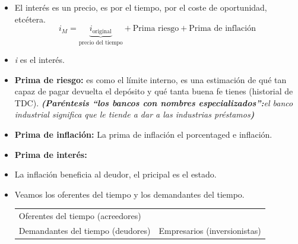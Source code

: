 \begin{itemize}
    \item El interés es un precio, es por el tiempo, por el coste de oportunidad, etcétera.
    \[
      i_{M}= \underbrace{i_{\text{original}}}_{\text{precio del tiempo}} + \text{Prima riesgo} + \text{Prima de inflación}
    \]
    
    \item \emph{i} es el interés.
    \item \textbf{Prima de riesgo:} es como el límite interno, es una estimación de qué tan capaz de pagar devuelta el depósito y qué tanta buena fe tienes (historial de TDC). \emph{\textbf{(Paréntesis ``los bancos con nombres especializados'':}el banco industrial significa que le tiende a dar a las industrias préstamos\textbf{)}}
    \item \textbf{Prima de inflación:} La prima de inflación el porcentaged e inflación.
    \item \textbf{Prima de interés:} 
   \begin{figure}[htbp]
       \centering
       \caption{}
       \label{}
   \end{figure} 
    
    \item La inflación beneficia al deudor, el pricipal es el estado.
    \item Veamos los oferentes del tiempo y los demandantes del tiempo.
    \begin{center}
    \begin{tabular}{ | p{5cm} | p{5cm} | }
     \hline
     Oferentes del tiempo (acreedores) & \\
     Demandantes del tiempo (deudores) & Empresarios (inversionistas) \\ 
     \hline
    \end{tabular}
    \end{center}
\end{itemize}



